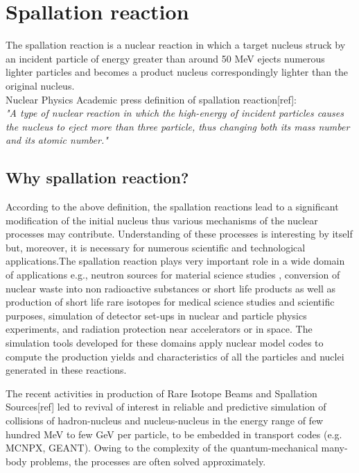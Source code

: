\section{Spallation reaction}
	
	The spallation reaction  is a nuclear reaction in which a target nucleus struck by an incident particle of energy greater than around 50 MeV ejects numerous lighter particles and becomes a product nucleus correspondingly lighter than the original nucleus. \\
	Nuclear Physics Academic press definition of spallation reaction[ref]: \\
	\textit{ "A type of nuclear reaction in which the high-energy of incident particles causes the nucleus to eject more than three particle, thus changing both its mass number and its atomic number."}
	\subsection{Why spallation reaction?}
	According to the above definition, the spallation reactions lead to a significant modification of the initial nucleus thus various mechanisms of the nuclear processes may contribute.  Understanding of these  processes is  interesting by itself but, moreover, it is  necessary for  numerous scientific and technological applications.The spallation reaction plays very important role in a wide domain of applications e.g., neutron sources for material science studies \cite{carpenter1977pulsed}, conversion of nuclear waste into non radioactive substances or short life products\cite{ravn98A} as well as production of short life rare isotopes for medical science studies \cite{bowman1992nuclear} and scientific purposes\cite{meneguzzi1971production}, simulation of detector set-ups in nuclear and particle physics experiments, and radiation protection near accelerators or in space. The simulation tools developed for these domains apply nuclear model codes to compute the production yields and characteristics of all the particles and nuclei generated in these reactions.\par
	The recent activities in production of Rare Isotope Beams and Spallation Sources[ref] led to revival of interest in reliable and predictive simulation of collisions of hadron-nucleus and nucleus-nucleus in the energy range of few hundred MeV to few GeV per particle, to be embedded in transport codes (e.g. MCNPX, GEANT). Owing to the complexity of the quantum-mechanical many-body problems, the processes are often solved approximately.

